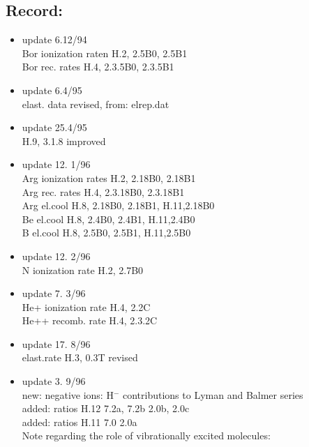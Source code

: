 \documentclass[12pt,dvipdfmx]{article}
\begin{document}
\subsection{Record:}\label{record}
\begin{itemize}
\item update  6.12/94 \\
   Bor ionization raten H.2, 2.5B0, 2.5B1 \\
                           Bor rec.   rates H.4, 2.3.5B0, 2.3.5B1 \\
 \item update  6.4/95 \\
  elast. data revised, from: elrep.dat \\
 \item update  25.4/95 \\
  H.9, 3.1.8 improved   \\
 \item update 12. 1/96 \\
   Arg ionization rates H.2, 2.18B0, 2.18B1   \\
   Arg rec.   rates H.4, 2.3.18B0, 2.3.18B1 \\
   Arg el.cool      H.8, 2.18B0, 2.18B1, H.11,2.18B0\\
   Be  el.cool      H.8, 2.4B0, 2.4B1, H.11,2.4B0\\
   B   el.cool      H.8, 2.5B0, 2.5B1, H.11,2.5B0\\
 \item update 12. 2/96 \\
   N ionization rate H.2, 2.7B0 \\
 \item update  7. 3/96 \\
   He+ ionization rate H.4, 2.2C \\
   He++ recomb. rate H.4, 2.3.2C \\
 \item update  17. 8/96 \\
   elast.rate H.3, 0.3T revised
 \item update   3. 9/96 \\
 new: negative ions: H$^-$ contributions to Lyman and Balmer series\\
   added: ratios H.12 7.2a, 7.2b 2.0b, 2.0c\\
   added: ratios H.11 7.0 2.0a\\

Note regarding the role of vibrationally excited molecules:


\end{itemize}
\end{document}
